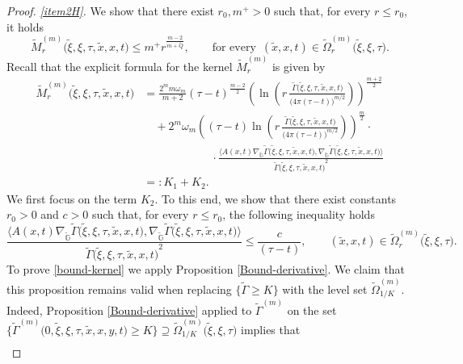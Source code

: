 \documentclass[11pt,a4paper]{article}
\numberwithin{equation}{section}
\def \tt {\tilde}
\def \GG {{\mathbb{G}}}
\def \G {{\Gamma}}
\def \t {{\tau}}
\def \x {{\xi}}
\def \O {{\Omega}}
\begin{document}
{{\begin{proof}
	
	\medskip
	\emph{\ref{item2H}.} We show that there exist $r_0,m^+>0$ such that, for every $r\leq r_0$, it holds 
	\begin{equation}
		\tt M_{ r}^{(m)}\big(\tt \x,\x,\t,\tt x,x,t\big)\leq m^+ r^{\frac{m-2}{m+\tt Q}},\qquad \text{for every }\, (\tt x, x,t)\in \tt \O^{(m)}_{r}\big(\tt \x, \x, \t\big).
	\end{equation}
	Recall that the explicit formula for the kernel $\tt M_{ r}^{(m)}$ is given by 
	\begin{equation}\label{kernel-formula}
		\begin{aligned}
			\tt M_{ r}^{(m)}\big(\tt \x,\x,\t,\tt x, x,t\big)&=\frac{2^{m} m\omega_m}{m+2}(\t-t)^\frac{m-2}{2}\left(\ln\left( r\, \frac{\tt \Gamma\big(\tt \x, \x, \t,\tt x, x,t\big)}{\big( 4\pi(\t-t)\big)^{m/2}} \right)\right)^\frac{m+2}{2}\\
			&\quad+2^m \omega_m \left((\t-t)\ln\left( r\, \frac{\tt \Gamma\big(\tt \x, \x, \t,\tt x, x,t\big)}{\big( 4\pi(\t-t)\big)^{m/2}} \right)\right)^\frac{m}{2}\cdot\\
			&\qquad\qquad \qquad \cdot\frac{\langle A(x,t)\nabla_{\tt \GG} \tt \Gamma\big(\tt \x, \x, \t,\tt x, x,t\big),\nabla_{\tt \GG}\tt \Gamma\big(\tt \x, \x, \t,\tt x, x,t\big) \rangle}{{\tt \Gamma\big(\tt \x, \x, \t,\tt x, x,t\big)}^2}\\
			&=:K_1+K_2.
		\end{aligned}
	\end{equation}
	We first focus on the term $K_2$. To this end, we show that there exist constants $r_0>0$ and $c>0$ such that, for every $r\leq r_0$, the following inequality holds 
	\begin{equation}\label{bound-kernel}
		\frac{\langle A(x,t)\nabla_{\tt \GG} \tt \Gamma\big(\tt \x, \x, \t,\tt x, x,t\big),\nabla_{\tt \GG}\tt \Gamma\big(\tt \x,\x, \t,\tt x, x,t\big) \rangle}{{\tt \Gamma\big(\tt \x, \x, \t,\tt x, x,t\big)}^2}\leq \frac{c}{(\t-t)},\qquad (\tt x, x,t)\in \tt \O^{(m)}_{r}\big(\tt \x, \x, \t\big).
	\end{equation}
	To prove \eqref{bound-kernel} we apply Proposition \ref{Bound-derivative}.  We claim that this proposition remains valid when replacing  $\big\{\tt\G\geq K\big\}$  with the level set $\tt\Omega_{1/K}^{(m)}$. Indeed, Proposition \ref{Bound-derivative} applied to  $\tt \G^{(m)}$ on the set $\Big\{\tt\G^{(m)}(0,\tt \x,\x,\t,\tt x,x,y,t\Big)\geq K\big\}\supseteq\tt\Omega_{1/K}^{(m)}\big(\tt \x,\x,\t\big)$ implies that
	\begin{equation}
		\begin{aligned}

\end{aligned}
\end{equation}
\end{proof}}}
\end{document}
